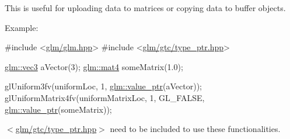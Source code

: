 This is useful for uploading data to matrices or copying data to buffer objects.

Example\-: 
\begin{DoxyCode}
\textcolor{preprocessor}{#include <\hyperlink{glm_8hpp}{glm/glm.hpp}>}
\textcolor{preprocessor}{#include <\hyperlink{type__ptr_8hpp}{glm/gtc/type\_ptr.hpp}>}

\hyperlink{structglm_1_1tvec3}{glm::vec3} aVector(3);
\hyperlink{structglm_1_1tmat4x4}{glm::mat4} someMatrix(1.0);

glUniform3fv(uniformLoc, 1, \hyperlink{group__gtc__type__ptr_gaf019636bb8bd7c9efb7c7ce3bb23bcfc}{glm::value\_ptr}(aVector));
glUniformMatrix4fv(uniformMatrixLoc, 1, GL\_FALSE, \hyperlink{group__gtc__type__ptr_gaf019636bb8bd7c9efb7c7ce3bb23bcfc}{glm::value\_ptr}(someMatrix));
\end{DoxyCode}


$<$\hyperlink{type__ptr_8hpp}{glm/gtc/type\-\_\-ptr.\-hpp}$>$ need to be included to use these functionalities. 

